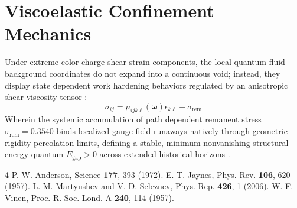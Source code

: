 \documentclass[reprint,amsmath,amssymb,aps,prd,nofootinbib]{revtex4-2}
\begin{document}
\section{Viscoelastic Confinement Mechanics}
Under extreme color charge shear strain components, the local quantum fluid background coordinates do not expand into a continuous void; instead, they display state dependent work hardening behaviors regulated by an anisotropic shear viscosity tensor \cite{vinen1957}:
\begin{equation}
\sigma_{ij} = \mu_{ijk\ell}(\boldsymbol{\omega})\epsilon_{k\ell} + \sigma_{\text{rem}}
\end{equation}
Wherein the systemic accumulation of path dependent remanent stress $\sigma_{\text{rem}} = 0.3540$ binds localized gauge field runaways natively through geometric rigidity percolation limits, defining a stable, minimum nonvanishing structural energy quantum $E_{\text{gap}} > 0$ across extended historical horizons \cite{martyushev2006}.

\begin{thebibliography}{4}
 P. W. Anderson, Science {\bf 177}, 393 (1972).
 E. T. Jaynes, Phys. Rev. {\bf 106}, 620 (1957).
 L. M. Martyushev and V. D. Seleznev, Phys. Rep. {\bf 426}, 1 (2006).
 W. F. Vinen, Proc. R. Soc. Lond. A {\bf 240}, 114 (1957).
\end{thebibliography}
\end{document}
